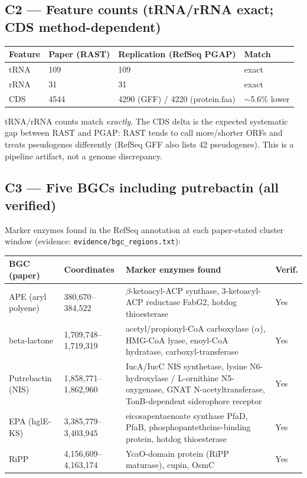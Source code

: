 \documentclass[11pt]{article}
\begin{document}
\subsection{C2 --- Feature counts (tRNA/rRNA exact; CDS method-dependent)}
\begin{tabular}{@{}llll@{}}
\toprule
Feature & Paper (RAST) & Replication (RefSeq PGAP) & Match \\ \midrule
tRNA & 109 & 109 & exact \\
rRNA & 31 & 31 & exact \\
CDS & 4544 & 4290 (GFF) / 4220 (protein.faa) & $\sim$5.6\% lower \\
\bottomrule
\end{tabular}

tRNA/rRNA counts match \emph{exactly}. The CDS delta is the expected systematic gap between RAST and PGAP: RAST tends to call more/shorter ORFs and treats pseudogenes differently (RefSeq GFF also lists 42 pseudogenes). This is a pipeline artifact, not a genome discrepancy.

\subsection{C3 --- Five BGCs including putrebactin (all verified)}
Marker enzymes found in the RefSeq annotation at each paper-stated cluster window (evidence: \texttt{evidence/bgc\_regions.txt}):
\begin{longtable}{@{}p{}p{}p{}p{}@{}}
\toprule
BGC (paper) & Coordinates & Marker enzymes found & Verif. \\ \midrule
APE (aryl polyene) & 380{,}670--384{,}522 & $\beta$-ketoacyl-ACP synthase, 3-ketoacyl-ACP reductase FabG2, hotdog thioesterase & Yes \\
beta-lactone & 1{,}709{,}748--1{,}719{,}319 & acetyl/propionyl-CoA carboxylase ($\alpha$), HMG-CoA lyase, enoyl-CoA hydratase, carboxyl-transferase & Yes \\
Putrebactin (NIS) & 1{,}858{,}771--1{,}862{,}960 & IucA/IucC NIS synthetase, lysine N6-hydroxylase / L-ornithine N5-oxygenase, GNAT N-acetyltransferase, TonB-dependent siderophore receptor & Yes \\
EPA (hglE-KS) & 3{,}385{,}779--3{,}403{,}945 & eicosapentaenoate synthase PfaD, PfaB, phosphopantetheine-binding protein, hotdog thioesterase & Yes \\
RiPP & 4{,}156{,}609--4{,}163{,}174 & YcaO-domain protein (RiPP maturase), cupin, OsmC & Yes \\
\bottomrule
\end{longtable}
\end{document}
